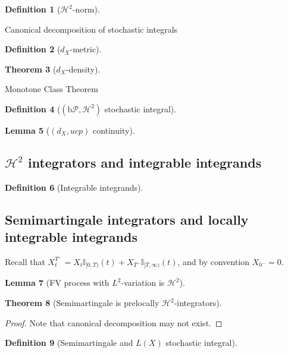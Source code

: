 \documentclass[openany,oneside]{book}
\newtheorem{thm}{Theorem}[section]
\newtheorem{lem}[thm]{Lemma}
\theoremstyle{definition}
\newtheorem{defn}[thm]{Definition}
\theoremstyle{remark}
\newcommand{\I}{\mathbb{I}} %
\newcommand{\sH}[1][2]{\mathcal{H}^{#1}} %
\newcommand{\pred}{\mathcal{P}} %
\newcommand{\bP}{\mathrm{b}\pred} %
\begin{document}
\begin{defn}[$\sH$-norm]

\end{defn}

Canonical decomposition of stochastic integrals

\begin{defn}[$d_X$-metric]

\end{defn}

\begin{thm}[$d_X$-density]

\end{thm}
Monotone Class Theorem

\begin{defn}[$(\bP,\sH)$ stochastic integral]

\end{defn}

\begin{lem}[$(d_X,ucp)$ continuity]

\end{lem}

\subsection{$\sH$ integrators and integrable integrands}
\begin{defn}[Integrable integrands]

\end{defn}


\subsection{Semimartingale integrators and locally integrable integrands}
Recall that $X^{T^-}_t = X_t\I_{[0,T)}(t) + X_{T^-}\I_{[T,\infty)}(t)$, and by convention $X_{0^-}=0$.

\begin{lem}[FV process with $L^2$-variation is $\sH$]

\end{lem}

\begin{thm}[Semimartingale is prelocally $\sH$-integrators]

\end{thm}
\begin{proof}
Note that canonical decomposition may not exist.
\end{proof}

\begin{defn}[Semimartingale and $L(X)$ stochastic integral]

\end{defn}
\end{document}
